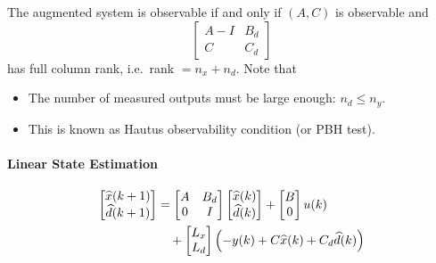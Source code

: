
The augmented system is observable if and only if $(A, C)$ is observable and
\begin{equation*}
    \begin{bmatrix}
        A - I & B_d \\
        C     & C_d
    \end{bmatrix}
\end{equation*}
has full column rank, i.e.\ rank $= n_x + n_d$.
\newpar{}
Note that
\begin{itemize}
    \item The number of measured outputs must be large enough: $n_d \leq n_y$.
    \item This is known as Hautus observability condition (or PBH test).
\end{itemize}

\paragraph{Linear State Estimation}
\noindent
\begin{align*}
    \begin{bmatrix}
        \widehat{x}(k + 1) \\
        \widehat{d}(k + 1)
    \end{bmatrix} & =
    \begin{bmatrix}
        A & B_d \\
        0 & I
    \end{bmatrix}
    \begin{bmatrix}
        \widehat{x}(k) \\
        \widehat{d}(k)
    \end{bmatrix}
    +\begin{bmatrix}
         B \\
         0
     \end{bmatrix}
    u(k)
    \\
                          & \quad+\begin{bmatrix}
                                      L_x \\
                                      L_d
                                  \end{bmatrix}
    \Bigl(-y(k) + C\widehat{x}(k) + C_d \widehat{d}(k)\Bigr)
\end{align*}



